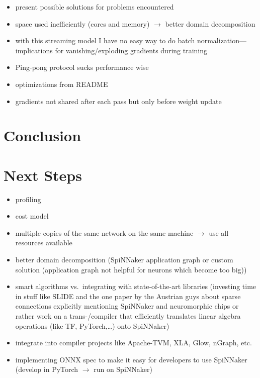 \documentclass[]{article}
\begin{document}
\begin{itemize}
  \item present possible solutions for problems encountered
  \item space used inefficiently (cores and memory) $\rightarrow$ better
    domain decomposition
  \item with this streaming model I have no easy way to do batch
    normalization---implications for vanishing/exploding gradients
    during training
  \item Ping-pong protocol sucks performance wise
  \item optimizations from README
  \item gradients not shared after each pass but only before weight
    update
\end{itemize}

\section{Conclusion}
\label{sec:conclusion}

\section{Next Steps}
\label{sec:next_steps}

\begin{itemize}
  \item profiling
  \item cost model
  \item multiple copies of the same network on the same machine
    $\rightarrow$ use all resources available
  \item better domain decomposition (SpiNNaker application graph or
    custom solution (application graph not helpful for neurons which
    become too big))
  \item smart algorithms vs.\ integrating with state-of-the-art libraries
    (investing time in stuff like SLIDE and the one paper by the Austrian
    guys about sparse connections explicitly mentioning SpiNNaker and
    neuromorphic chips or rather work on a trans-/compiler
    that efficiently translates linear algebra operations (like TF,
    PyTorch,\dots) onto SpiNNaker)
  \item integrate into compiler projects like Apache-TVM, XLA, Glow,
   nGraph, etc.
  \item implementing ONNX spec to make it easy for developers to use
    SpiNNaker (develop in PyTorch $\rightarrow$ run on SpiNNaker)
\end{itemize}
\end{document}
